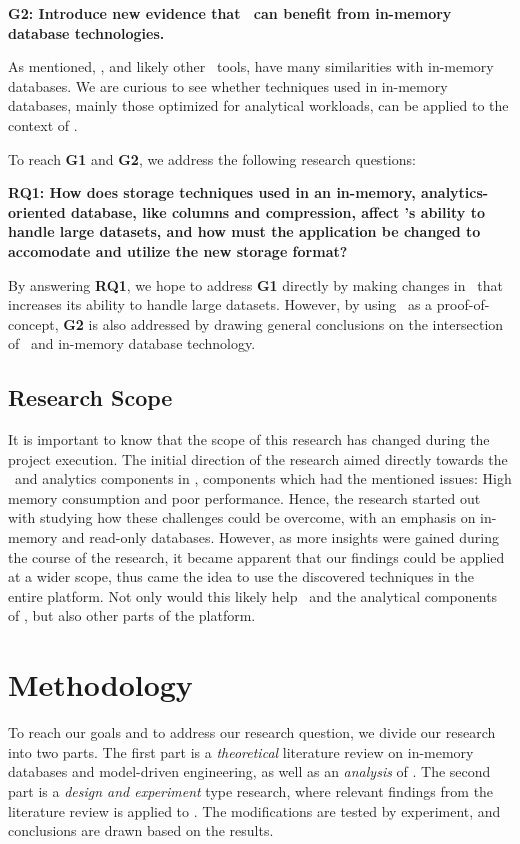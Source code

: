 \setlength{\leftskip}{1cm}

\textbf{G2: Introduce new evidence that \mde~can benefit from in-memory database technologies.}

\setlength{\leftskip}{0pt}

As mentioned, \gap, and likely other \mde~tools, have many similarities with in-memory databases. We are curious to see whether techniques used in in-memory databases, mainly those optimized for analytical workloads, can be applied to the context of \mde. 

To reach \textbf{G1} and \textbf{G2}, we address the following research questions:

\setlength{\leftskip}{1cm}

\textbf{RQ1: How does storage techniques used in an in-memory, analytics-oriented database, like columns and compression, affect \gap's ability to handle large datasets, and how must the application be changed to accomodate and utilize the new storage format?} 

\setlength{\leftskip}{0pt}

By answering \textbf{RQ1}, we hope to address \textbf{G1} directly by making changes in \gap~that increases its ability to handle large datasets. However, by using \gap~as a proof-of-concept, \textbf{G2} is also addressed by drawing general conclusions on the intersection of \mde~and in-memory database technology.

\subsection{Research Scope}
\label{sub:Research Scope}
It is important to know that the scope of this research has changed during the project execution. The initial direction of the research aimed directly towards the \bi~and analytics components in \gap, components which had the mentioned issues: High memory consumption and poor performance. Hence, the research started out with studying how these challenges could be overcome, with an emphasis on in-memory and read-only databases. However, as more insights were gained during the course of the research, it became apparent that our findings could be applied at a wider scope, thus came the idea to use the discovered techniques in the entire platform. Not only would this likely help \bi~and the analytical components of \gap, but also other parts of the platform.

\section{Methodology}
\label{sec:Methodology}
To reach our goals and to address our research question, we divide our research into two parts. The first part is a \textit{theoretical} literature review on in-memory databases and model-driven engineering, as well as an \textit{analysis} of \gap. The second part is a \textit{design and experiment} type research, where relevant findings from the literature review is applied to \gap. The modifications are tested by experiment, and conclusions are drawn based on the results.

